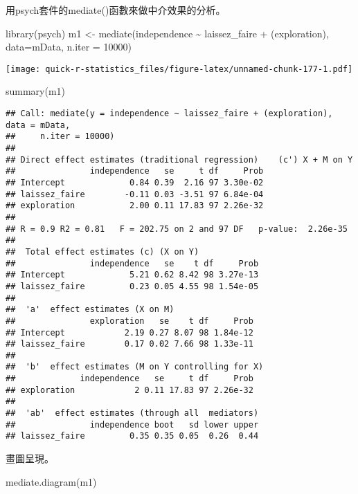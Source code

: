 \documentclass[
]{book}
\newenvironment{Shaded}{\begin{snugshade}}{\end{snugshade}}
\newcommand{\AttributeTok}[1]{\textcolor[rgb]{0.77,0.63,0.00}{#1}}
\newcommand{\DecValTok}[1]{\textcolor[rgb]{0.00,0.00,0.81}{#1}}
\newcommand{\FunctionTok}[1]{\textcolor[rgb]{0.00,0.00,0.00}{#1}}
\newcommand{\NormalTok}[1]{#1}
\newcommand{\OtherTok}[1]{\textcolor[rgb]{0.56,0.35,0.01}{#1}}
\newcommand{\SpecialCharTok}[1]{\textcolor[rgb]{0.00,0.00,0.00}{#1}}
\begin{document}
用psych套件的mediate()函數來做中介效果的分析。

\begin{Shaded}
\begin{Highlighting}[]
\FunctionTok{library}\NormalTok{(psych)}
\NormalTok{m1 }\OtherTok{\textless{}{-}} \FunctionTok{mediate}\NormalTok{(independence }\SpecialCharTok{\textasciitilde{}}\NormalTok{ laissez\_faire }\SpecialCharTok{+}\NormalTok{ (exploration), }\AttributeTok{data=}\NormalTok{mData, }\AttributeTok{n.iter =} \DecValTok{10000}\NormalTok{) }
\end{Highlighting}
\end{Shaded}

\texttt{[image: quick-r-statistics\_files/figure-latex/unnamed-chunk-177-1.pdf]}

\begin{Shaded}
\begin{Highlighting}[]
\FunctionTok{summary}\NormalTok{(m1)}
\end{Highlighting}
\end{Shaded}

\begin{verbatim}
## Call: mediate(y = independence ~ laissez_faire + (exploration), data = mData, 
##     n.iter = 10000)
## 
## Direct effect estimates (traditional regression)    (c') X + M on Y 
##               independence   se     t df     Prob
## Intercept             0.84 0.39  2.16 97 3.30e-02
## laissez_faire        -0.11 0.03 -3.51 97 6.84e-04
## exploration           2.00 0.11 17.83 97 2.26e-32
## 
## R = 0.9 R2 = 0.81   F = 202.75 on 2 and 97 DF   p-value:  2.26e-35 
## 
##  Total effect estimates (c) (X on Y) 
##               independence   se    t df     Prob
## Intercept             5.21 0.62 8.42 98 3.27e-13
## laissez_faire         0.23 0.05 4.55 98 1.54e-05
## 
##  'a'  effect estimates (X on M) 
##               exploration   se    t df     Prob
## Intercept            2.19 0.27 8.07 98 1.84e-12
## laissez_faire        0.17 0.02 7.66 98 1.33e-11
## 
##  'b'  effect estimates (M on Y controlling for X) 
##             independence   se     t df     Prob
## exploration            2 0.11 17.83 97 2.26e-32
## 
##  'ab'  effect estimates (through all  mediators)
##               independence boot   sd lower upper
## laissez_faire         0.35 0.35 0.05  0.26  0.44
\end{verbatim}

畫圖呈現。

\begin{Shaded}
\begin{Highlighting}[]
\FunctionTok{mediate.diagram}\NormalTok{(m1)}
\end{Highlighting}
\end{Shaded}
\end{document}
